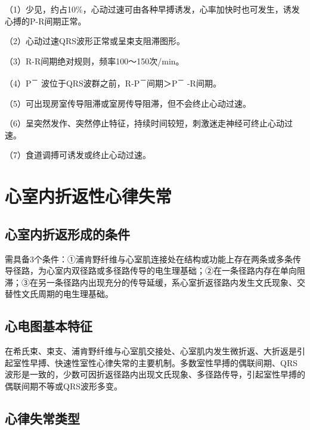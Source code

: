 （1）少见，约占10\%，心动过速可由各种早搏诱发，心率加快时也可发生，诱发心搏的P-R间期正常。

（2）心动过速QRS波形正常或呈束支阻滞图形。

（3）R-R间期绝对规则，频率100～150次/min。

（4）P\textsuperscript{－} 波位于QRS波群之前，R-P\textsuperscript{－}间期＞P\textsuperscript{－} -R间期。

（5）可出现房室传导阻滞或室房传导阻滞，但不会终止心动过速。

（6）呈突然发作、突然停止特征，持续时间较短，刺激迷走神经可终止心动过速。

（7）食道调搏可诱发或终止心动过速。

\protect\hypertarget{text00021.htmlux5cux23subid240}{}{}

\section{心室内折返性心律失常}

\protect\hypertarget{text00021.htmlux5cux23subid241}{}{}

\subsection{心室内折返形成的条件}

需具备3个条件：①浦肯野纤维与心室肌连接处在结构或功能上存在两条或多条传导径路，为心室内双径路或多径路传导的电生理基础；②在一条径路内存在单向阻滞；③在另一条径路内出现充分的传导延缓，系心室折返径路内发生文氏现象、交替性文氏周期的电生理基础。

\protect\hypertarget{text00021.htmlux5cux23subid242}{}{}

\subsection{心电图基本特征}

在希氏束、束支、浦肯野纤维与心室肌交接处、心室肌内发生微折返、大折返是引起室性早搏、快速性室性心律失常的主要机制。多数室性早搏的偶联间期、QRS波形是一致的，少数可因折返径路内出现文氏现象、多径路传导，引起室性早搏的偶联间期不等或QRS波形多变。

\protect\hypertarget{text00021.htmlux5cux23subid243}{}{}

\subsection{心律失常类型}

